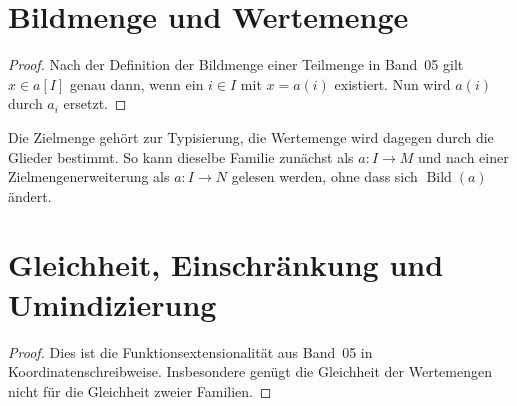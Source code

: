 \documentclass[main.tex]{subfiles}
\begin{document}
\section{Bildmenge und Wertemenge}


\begin{proof}
Nach der Definition der Bildmenge einer Teilmenge in Band~05 gilt
\(x\in a[I]\) genau dann, wenn ein \(i\in I\) mit \(x=a(i)\) existiert.
Nun wird \(a(i)\) durch \(a_i\) ersetzt.
\end{proof}



Die Zielmenge gehört zur Typisierung, die Wertemenge wird dagegen durch die
Glieder bestimmt. So kann dieselbe Familie zunächst als \(a\colon I\to M\)
und nach einer Zielmengenerweiterung als \(a\colon I\to N\) gelesen werden,
ohne dass sich \(\operatorname{Bild}(a)\) ändert.

\section{Gleichheit, Einschränkung und Umindizierung}

\begin{proof}
Dies ist die Funktionsextensionalität aus Band~05 in Koordinatenschreibweise.
Insbesondere genügt die Gleichheit der Wertemengen nicht für die Gleichheit
zweier Familien.
\end{proof}
\end{document}
